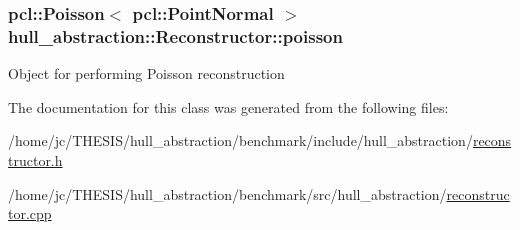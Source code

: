 \subsubsection[{\texorpdfstring{poisson}{poisson}}]{\setlength{\rightskip}{0pt plus 5cm}pcl\+::\+Poisson$<$ pcl\+::\+Point\+Normal $>$ hull\+\_\+abstraction\+::\+Reconstructor\+::poisson\hspace{0.3cm}{\ttfamily [private]}}\hypertarget{classhull__abstraction_1_1_reconstructor_a60dfa765833af8d05f1426be0e96adb0}{}\label{classhull__abstraction_1_1_reconstructor_a60dfa765833af8d05f1426be0e96adb0}
Object for performing Poisson reconstruction 

The documentation for this class was generated from the following files\+:\begin{DoxyCompactItemize}
\item 
/home/jc/\+T\+H\+E\+S\+I\+S/hull\+\_\+abstraction/benchmark/include/hull\+\_\+abstraction/\hyperlink{benchmark_2include_2hull__abstraction_2reconstructor_8h}{reconstructor.\+h}\item 
/home/jc/\+T\+H\+E\+S\+I\+S/hull\+\_\+abstraction/benchmark/src/hull\+\_\+abstraction/\hyperlink{benchmark_2src_2hull__abstraction_2reconstructor_8cpp}{reconstructor.\+cpp}\end{DoxyCompactItemize}

